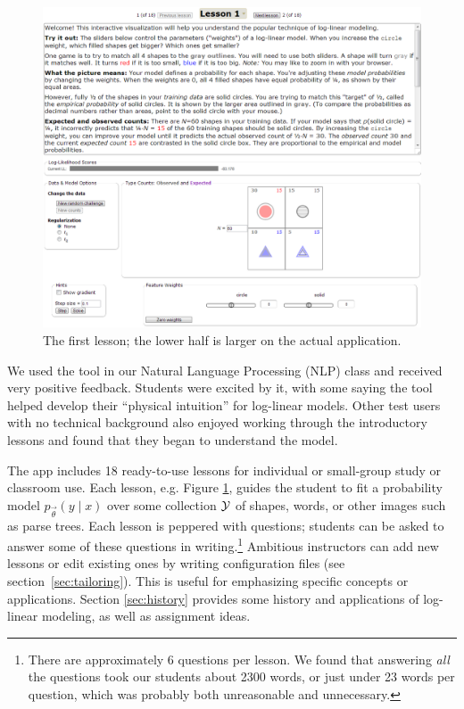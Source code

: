 \documentclass[11pt,letterpaper]{article}
\newcommand{\Note}[1]{}
\renewcommand{\Note}[1]{\hl{[#1]}}  %
\newcommand{\NoteSigned}[3]{{\sethlcolor{#2}\Note{#1: #3}}}
\newcommand{\NoteFF}[1]{\NoteSigned{FF}{LightBlue}{#1}}
\newcommand{\NoteJE}[1]{\NoteSigned{JE}{LightGreen}{#1}}
\newcommand{\NumLessons}[0]{18}%
\begin{document}
\begin{figure}
\centering
\includegraphics[scale=.47]{images/lesson1-060713-intro-zoom-with18.PNG}
\caption{The first lesson; the lower half is larger on the actual
  application.}
\label{fig:lesson1}
\end{figure}

We used the tool in our Natural Language Processing (NLP) class and received
very positive feedback.  Students were excited by it, with some saying
the tool helped develop their ``physical intuition'' for log-linear
models.
Other test users with no 
technical background also enjoyed working
through the introductory lessons and found that they began to understand 
the model.

The app includes \NumLessons{} ready-to-use lessons for individual or
small-group study or classroom use.  Each lesson, e.g. Figure
\ref{fig:lesson1}, guides the student to fit a probability model $p_{\vec{\theta}}(y \mid
x)$ over some collection ${\cal Y}$ of shapes, words, or other images
such as parse trees.  Each lesson is peppered with questions; students
can be asked to answer some of these questions in
writing.\footnote{There are approximately 6 questions per lesson. We
  found that answering {\em all} the questions took our students about
  2300 words, or just under 23 words per question, which was probably
  both unreasonable and unnecessary.}  Ambitious instructors can add new
lessons or edit existing ones by writing configuration files (see
section~\ref{sec:tailoring}). This is useful for emphasizing specific
concepts or applications.
Section \ref{sec:history} provides some history and applications of log-linear
modeling, as well as assignment ideas.
\end{document}
